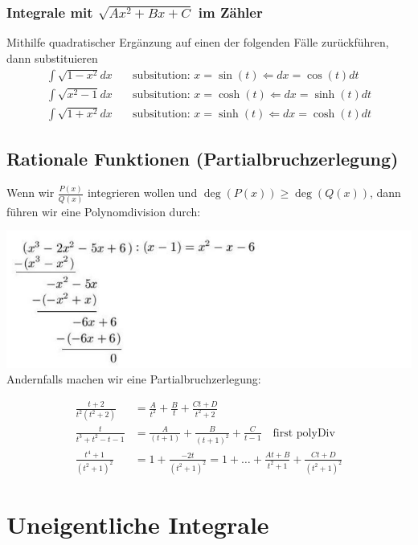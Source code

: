 \documentclass[25pt]{sciposter}
\begin{document}
\begin{multicols}{3}
\subsubsection*{Integrale mit $\sqrt{Ax^2 + Bx + C}$ im Zähler}
Mithilfe quadratischer Ergänzung auf einen der folgenden Fälle zurückführen, dann substituieren
\begin{align*}
\int {\sqrt{1-x^2}} dx \quad &\text{subsitution: } x = \sin(t) \Leftarrow dx = \cos(t) dt\\
\int {\sqrt{x^2-1}} dx \quad &\text{subsitution: } x = \cosh(t) \Leftarrow dx = \sinh(t) dt \\
\int {\sqrt{1+x^2}} dx \quad &\text{subsitution: } x = \sinh(t) \Leftarrow dx = \cosh(t) dt
\end{align*}



\subsection*{Rationale Funktionen (Partialbruchzerlegung)}

Wenn wir $\frac{P(x)}{Q(x)}$ integrieren wollen und $\deg(P(x)) \geq \deg(Q(x))$, dann führen wir eine Polynomdivision durch:

\includegraphics[width=0.7\linewidth]{img/polyDiv.png}\\
Andernfalls machen wir eine Partialbruchzerlegung:

\begin{align*}
	\frac{t+2}{t^2(t^2 + 2)} &= \frac{A}{t^2} + \frac{B}{t} + \frac{Ct + D}{t^2 + 2}\\
	\frac{t}{t^3 + t^2 - t - 1} &= \frac{A}{(t+1)} + \frac{B}{(t+1)^2} + \frac{C}{t-1} \quad \text{first polyDiv}\\
	\frac{t^4 + 1}{(t^2 + 1)^2} &= 1 + \frac{-2t}{(t^2 + 1)^2} = 1 + \ldots + \frac{At + B}{t^2 + 1} + \frac{Ct + D}{(t^2 + 1)^2}
\end{align*}



\section*{Uneigentliche Integrale}



\end{multicols}
\end{document}
